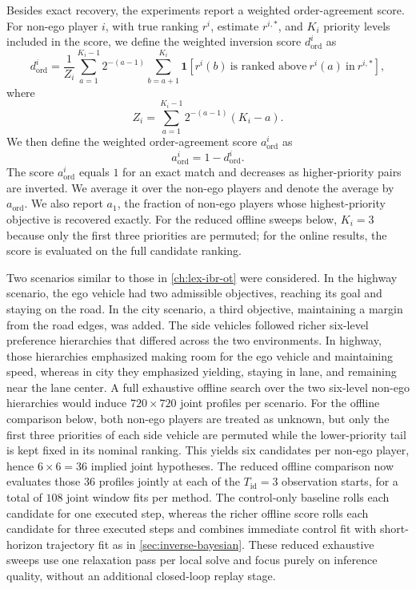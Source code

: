 Besides exact recovery, the experiments report a weighted order-agreement score.
For non-ego player $i$, with true ranking $r^i$, estimate $r^{i,*}$, and
$K_i$ priority levels included in the score, we define the weighted inversion score $d_{\mathrm{ord}}^i$ as
\begin{equation*}
    d_{\mathrm{ord}}^i
    =
    \frac{1}{Z_i}
    \sum_{a=1}^{K_i-1}
    2^{-(a-1)}
    \sum_{b=a+1}^{K_i}
    \mathbf{1}\!\left[
        r^i(b)\ \text{is ranked above}\ r^i(a)\ \text{in}\ r^{i,*}
    \right],
\end{equation*}
where
\[
Z_i = \sum_{a=1}^{K_i-1} 2^{-(a-1)} (K_i-a).
\]
We then define the weighted order-agreement score $a_{\mathrm{ord}}^i$ as
\begin{equation*}
    a_{\mathrm{ord}}^i = 1 - d_{\mathrm{ord}}^i.
\end{equation*}
The score $a_{\mathrm{ord}}^i$ equals $1$ for an exact match and decreases as higher-priority pairs are inverted.
We average it over the non-ego players and denote the average by $a_{\mathrm{ord}}$.
We also report $a_1$, the fraction of non-ego players whose highest-priority objective is recovered exactly.
For the reduced offline sweeps below, $K_i = 3$ because only the first three priorities are permuted; for the online
results, the score is evaluated on the full candidate ranking.

Two scenarios similar to those in \cref{ch:lex-ibr-ot} were considered.
In the highway scenario, the ego vehicle had two admissible objectives, reaching its goal and staying on the road.
In the city scenario, a third objective, maintaining a margin from the road edges, was added.
The side vehicles followed richer six-level preference hierarchies that differed across the two environments.
In highway, those hierarchies emphasized making room for the ego vehicle and maintaining speed, whereas in city
they emphasized yielding, staying in lane, and remaining near the lane center.
A full exhaustive offline search over the two six-level non-ego hierarchies would induce
$720 \times 720$ joint profiles per scenario.
For the offline comparison below, both non-ego players are treated as unknown, but only the first three priorities of
each side vehicle are permuted while the lower-priority tail is kept fixed in its nominal ranking.
This yields six candidates per non-ego player, hence $6 \times 6 = 36$ implied joint hypotheses.
The reduced offline comparison now evaluates those $36$ profiles jointly at each of the
$T_{\mathrm{id}} = 3$ observation starts, for a total of $108$ joint window fits per method.
The control-only baseline rolls each candidate for one executed step, whereas the richer offline score rolls each
candidate for three executed steps and combines immediate control fit with short-horizon trajectory fit as in
\cref{sec:inverse-bayesian}.
These reduced exhaustive sweeps use one relaxation pass per local solve and focus purely on inference quality,
without an additional closed-loop replay stage.

